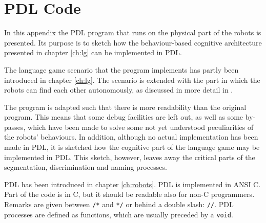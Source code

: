 \chapter{PDL Code}\label{a:pdl}

In this appendix the PDL program that runs on the physical part of the robots is presented. Its purpose is to sketch how the behaviour-based cognitive architecture presented in chapter \ref{ch:lg} can be implemented in PDL.

The language game scenario that the program implements has partly been introduced in chapter \ref{ch:lg}. The scenario is extended with the part in which the robots can find each other autonomously, as discussed in more detail in \cite{steelsvogt:1997,vogt:1997}.


The program is adapted such that there is more readability than the original program. This means that some debug facilities are left out, as well as some by-passes, which have been made to solve some not yet understood peculiarities of the robots' behaviours. In addition, although no actual implementation has been made in PDL, it is sketched how the cognitive part of the language game may be implemented in PDL. This sketch, however, leaves away the critical parts of the segmentation, discrimination and naming processes.


PDL has been introduced in chapter \ref{ch:robots}. PDL is implemented in ANSI C. Part of the code is in C, but it should be readable also for non-C programmers. Remarks are given between \texttt{/*} and \texttt{*/} or behind a double slash: \texttt{//}. PDL processes are defined as functions, which are usually preceded by a \texttt{void}.


